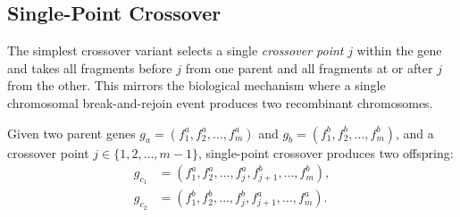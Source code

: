 \subsection{Single-Point Crossover}

The simplest crossover variant selects a single \emph{crossover point} $j$ within the gene and takes all fragments before $j$ from one parent and all fragments at or after $j$ from the other. This mirrors the biological mechanism where a single chromosomal break-and-rejoin event produces two recombinant chromosomes.

\begin{definition}
Given two parent genes $g_a = (f_1^a, f_2^a, \ldots, f_m^a)$ and $g_b = (f_1^b, f_2^b, \ldots, f_m^b)$, and a crossover point $j \in \{1, 2, \ldots, m-1\}$, single-point crossover produces two offspring:
\begin{align}
g_{c_1} &= (f_1^a, f_2^a, \ldots, f_j^a, f_{j+1}^b, \ldots, f_m^b), \\
g_{c_2} &= (f_1^b, f_2^b, \ldots, f_j^b, f_{j+1}^a, \ldots, f_m^a).
\end{align}
\end{definition}

